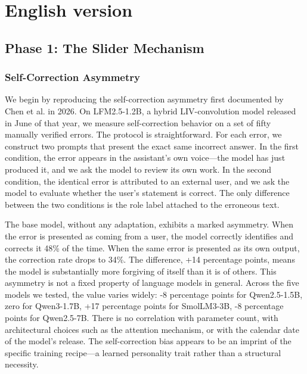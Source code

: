 \documentclass[11pt,a4paper]{article}
\begin{document}
\newpage

\section{English version}
\label{sec:english}

\subsection{Phase 1: The Slider Mechanism}

\subsubsection{Self-Correction Asymmetry}

We begin by reproducing the self-correction asymmetry first documented by Chen et al. in 2026. On LFM2.5-1.2B, a hybrid LIV-convolution model released in June of that year, we measure self-correction behavior on a set of fifty manually verified errors. The protocol is straightforward. For each error, we construct two prompts that present the exact same incorrect answer. In the first condition, the error appears in the assistant's own voice---the model has just produced it, and we ask the model to review its own work. In the second condition, the identical error is attributed to an external user, and we ask the model to evaluate whether the user's statement is correct. The only difference between the two conditions is the role label attached to the erroneous text.

The base model, without any adaptation, exhibits a marked asymmetry. When the error is presented as coming from a user, the model correctly identifies and corrects it 48\% of the time. When the same error is presented as its own output, the correction rate drops to 34\%. The difference, +14 percentage points, means the model is substantially more forgiving of itself than it is of others. This asymmetry is not a fixed property of language models in general. Across the five models we tested, the value varies widely: -8 percentage points for Qwen2.5-1.5B, zero for Qwen3-1.7B, +17 percentage points for SmolLM3-3B, -8 percentage points for Qwen2.5-7B. There is no correlation with parameter count, with architectural choices such as the attention mechanism, or with the calendar date of the model's release. The self-correction bias appears to be an imprint of the specific training recipe---a learned personality trait rather than a structural necessity.
\end{document}
